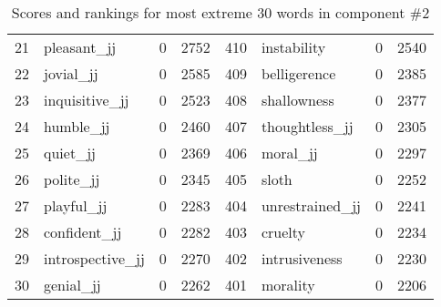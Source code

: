 \begin{table}[tbp]
\begin{tabular}{| rlr@{.}l | rlr@{.}l |}
    21 & pleasant\_jj & 0 & 2752    &    410 & instability & 0 & 2540 \\
    22 & jovial\_jj & 0 & 2585    &    409 & belligerence & 0 & 2385 \\
    23 & inquisitive\_jj & 0 & 2523    &    408 & shallowness & 0 & 2377 \\
    24 & humble\_jj & 0 & 2460    &    407 & thoughtless\_jj & 0 & 2305 \\
    25 & quiet\_jj & 0 & 2369    &    406 & moral\_jj & 0 & 2297 \\
    26 & polite\_jj & 0 & 2345    &    405 & sloth & 0 & 2252 \\
    27 & playful\_jj & 0 & 2283    &    404 & unrestrained\_jj & 0 & 2241 \\
    28 & confident\_jj & 0 & 2282    &    403 & cruelty & 0 & 2234 \\
    29 & introspective\_jj & 0 & 2270    &    402 & intrusiveness & 0 & 2230 \\
    30 & genial\_jj & 0 & 2262    &    401 & morality & 0 & 2206 \\
    \hline
    \end{tabular}
    \caption{Scores and rankings for most extreme 30 words in component \#2} 
\end{table}
\clearpage
